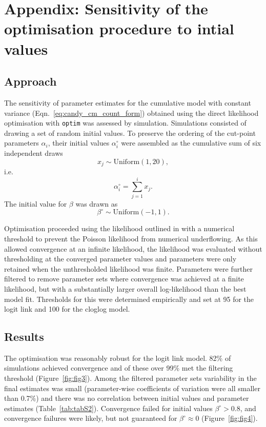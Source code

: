 \newpage
\renewcommand\thefigure{S\arabic{figure}}    
\setcounter{figure}{0} 
\renewcommand\thetable{S\arabic{table}}    
\setcounter{table}{0}

\section{Appendix: Sensitivity of the optimisation procedure to intial values}
\subsection{Approach}
The sensitivity of parameter estimates for the cumulative model with constant variance (Eqn.~\ref{eq:candy_cm_count_form}) obtained using the direct likelihood optimisation with \verb+optim+ was assessed by simulation.
Simulations consisted of drawing a set of random initial values. To preserve the ordering of the cut-point parameters $\alpha_i$, their initial values $\alpha^{\circ}_i$ were assembled as the cumulative sum of six independent draws $$x_j \sim \mathrm{Uniform}(1,20),$$ i.e. $$\alpha^{\circ}_i = \sum_{j=1}^i x_j.$$ The initial value for $\beta$ was drawn as $$\beta^{\circ}\sim\mathrm{Uniform}(-1,1).$$

Optimisation proceeded using the likelihood outlined in with a numerical threshold to prevent the Poisson likelihood from numerical underflowing. As this allowed convergence at an infinite likelihood, the likelihood was evaluated without thresholding at the converged parameter values and parameters were only retained when the unthresholded likelihood was finite. 
Parameters were further filtered to remove parameter sets where convergence was achieved at a finite likelihood, but with a substantially larger overall log-likelihood than the best model fit. Thresholds for this were determined empirically and set at 95 for the logit link and 100 for the cloglog model.

\subsection{Results}
The optimisation was reasonably robust for the logit link model. 82\% of simulations achieved convergence and of these over 99\% met the filtering threshold (Figure~\ref{fig:fig3}). Among the filtered parameter sets variability in the final estimates was small (parameter-wise coefficients of variation were all smaller than 0.7\%) and there was no correlation between initial values and parameter estimates (Table~\ref{tab:tabS2}). Convergence failed for initial values $\beta^{\circ}>0.8$, and convergence failures were likely, but not guaranteed for $\beta^{\circ}\approx 0$ (Figure~\ref{fig:fig4}).

